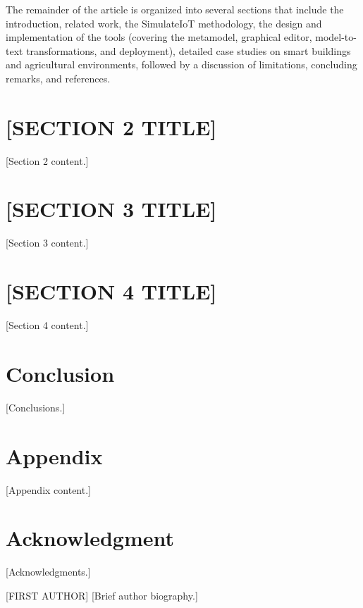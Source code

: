 \documentclass[journal]{IEEEtran}
\begin{document}
The remainder of the article is organized into several sections that include the introduction, related work, the SimulateIoT methodology, the design and implementation of the tools (covering the metamodel, graphical editor, model-to-text transformations, and deployment), detailed case studies on smart buildings and agricultural environments, followed by a discussion of limitations, concluding remarks, and references.


\section{[SECTION 2 TITLE]}
\label{sec:section2}

[Section 2 content.]


\section{[SECTION 3 TITLE]}
\label{sec:section3}

[Section 3 content.]


\section{[SECTION 4 TITLE]}
\label{sec:section4}

[Section 4 content.]


\section{Conclusion}
\label{sec:conclusion}

[Conclusions.]


\appendices
\section{Appendix}
[Appendix content.]


\section*{Acknowledgment}

[Acknowledgments.]




\begin{IEEEbiographynophoto}{[FIRST AUTHOR]}
[Brief author biography.]
\end{IEEEbiographynophoto}




\end{document}
